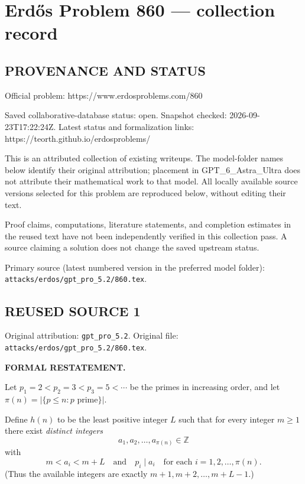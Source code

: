 \section*{Erd\H{o}s Problem 860 --- collection record}

\subsection*{PROVENANCE AND STATUS}
Official problem: https://www.erdosproblems.com/860

Saved collaborative-database status: open.
Snapshot checked: 2026-09-23T17:22:24Z.
Latest status and formalization links: https://teorth.github.io/erdosproblems/

This is an attributed collection of existing writeups. The model-folder names below identify their original attribution; placement in GPT\_6\_Astra\_Ultra does not attribute their mathematical work to that model. All locally available source versions selected for this problem are reproduced below, without editing their text.

Proof claims, computations, literature statements, and completion estimates in the reused text have not been independently verified in this collection pass. A source claiming a solution does not change the saved upstream status.

Primary source (latest numbered version in the preferred model folder): \texttt{attacks/erdos/gpt\_pro\_5.2/860.tex}.

\subsection*{REUSED SOURCE 1}
Original attribution: \texttt{gpt\_pro\_5.2}.
Original file: \texttt{attacks/erdos/gpt\_pro\_5.2/860.tex}.


\noindent\textbf{FORMAL RESTATEMENT.}

Let $p_1=2<p_2=3<p_3=5<\cdots$ be the primes in increasing order, and let $\pi(n)=|\{p\le n : p\text{ prime}\}|$.

Define $h(n)$ to be the least positive integer $L$ such that for every integer $m\ge 1$ there exist \emph{distinct integers}
\[
a_1,a_2,\dots,a_{\pi(n)}\in\mathbb Z
\]
with
\[
 m < a_i < m+L\quad\text{and}\quad p_i\mid a_i\quad\text{for each }i=1,2,\dots,\pi(n).
\]
(Thus the available integers are exactly $m+1, m+2,\dots,m+L-1$.)

